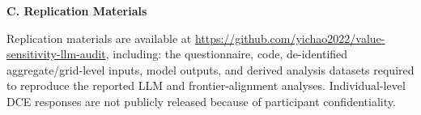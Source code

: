 \documentclass[12pt]{article}
\begin{document}
\textbf{C. Replication Materials}

Replication materials are available at \url{https://github.com/yichao2022/value-sensitivity-llm-audit}, including: the questionnaire, code, de-identified aggregate/grid-level inputs, model outputs, and derived analysis datasets required to reproduce the reported LLM and frontier-alignment analyses. Individual-level DCE responses are not publicly released because of participant confidentiality.

\appendix
\end{document}
